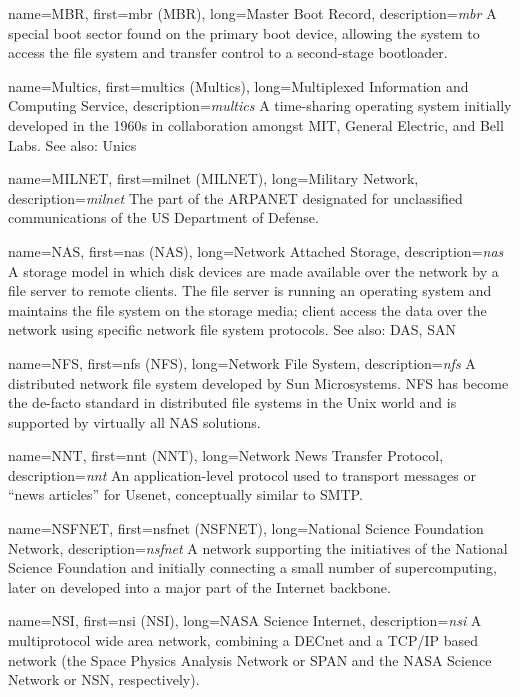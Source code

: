 {
	name={MBR},
	first={\acrlong{mbr} (MBR)},
	long={Master Boot Record},
	description={{\em \acrlong{mbr}} A special
boot sector found on the primary boot device, allowing
the system to access the file system and transfer
control to a second-stage bootloader.}
}


{
	name={Multics},
	first={\acrlong{multics} (Multics)},
	long={Multiplexed Information and Computing Service},
	description={{\em \acrlong{multics}} A time-sharing operating system
initially developed in the 1960s in collaboration amongst MIT, General Electric,
and Bell Labs. See also: Unics}
}

{
	name={MILNET},
	first={\acrlong{milnet} (MILNET)},
	long={Military Network},
	description={{\em \acrlong{milnet}} The part of the ARPANET designated
for unclassified communications of the US Department
of Defense.}
}

{
	name={NAS},
	first={\acrlong{nas} (NAS)},
	long={Network Attached Storage},
	description={{\em \acrlong{nas}} A storage model in which disk
devices are made available over the network by a file server to remote
clients.  The file server is running an operating system and maintains the
file system on the storage media; client access the data over the network
using specific network file system protocols.  See
also: DAS, SAN}
}

{
	name={NFS},
	first={\acrlong{nfs} (NFS)},
	long={Network File System},
	description={{\em \acrlong{nfs}} A distributed network file system
developed by Sun Microsystems.  NFS has become the de-facto standard in
distributed file systems in the Unix world and is supported by virtually
all NAS solutions.}
}

{
	name={NNT},
	first={\acrlong{nnt} (NNT)},
	long={Network News Transfer Protocol},
	description={{\em \acrlong{nnt}} An application-level
protocol used to transport messages or ``news articles'' for Usenet,
conceptually similar to SMTP.}
}

{
	name={NSFNET},
	first={\acrlong{nsfnet} (NSFNET)},
	long={National Science Foundation Network},
	description={{\em \acrlong{nsfnet}} A network
supporting the initiatives of the National Science Foundation and
initially connecting a small number of supercomputing, later on developed
into a major part of the Internet backbone.}
}

{
	name={NSI},
	first={\acrlong{nsi} (NSI)},
	long={NASA Science Internet},
	description={{\em \acrlong{nsi}} A multiprotocol wide area network,
combining a DECnet and a TCP/IP based network (the Space Physics Analysis
Network or SPAN and the NASA Science Network or NSN,
respectively).}
}

